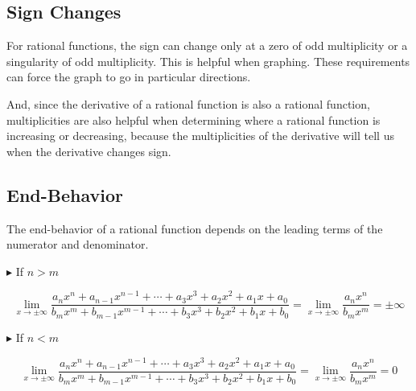 \documentclass{ximera}
\begin{document}
\subsection*{Sign Changes}

For rational functions, the sign can change only at a zero of odd multiplicity or a singularity of odd multiplicity. This is helpful when graphing. These requirements can force the graph to go in particular directions.

And, since the derivative of a rational function is also a rational function, multiplicities are also helpful when determining where a rational function is increasing or decreasing, because the multiplicities of the derivative will tell us when the derivative changes sign. 









\subsection*{End-Behavior}



The end-behavior of a rational function depends on the leading terms of the numerator and denominator.





\textbf{\textcolor{red!70!darkgray}{$\blacktriangleright$}} If $n > m$




\[   \lim\limits_{x \to \pm\infty}  \frac{ a_n x^n + a_{n-1} x^{n-1} + \cdots + a_3 x^3 + a_2 x^2 + a_1 x + a_0  } { b_m x^m + b_{m-1} x^{m-1} + \cdots + b_3 x^3 + b_2 x^2 + b_1 x + b_0 }   = \lim\limits_{x \to \pm\infty} \frac{ a_n x^n } { b_m x^m } = \pm \infty
\]











\textbf{\textcolor{red!70!darkgray}{$\blacktriangleright$}} If $n < m$




\[  \lim\limits_{x \to \pm\infty} \frac{ a_n x^n + a_{n-1} x^{n-1} + \cdots + a_3 x^3 + a_2 x^2 + a_1 x + a_0  } { b_m x^m + b_{m-1} x^{m-1} + \cdots + b_3 x^3 + b_2 x^2 + b_1 x + b_0 }   = \lim\limits_{x \to \pm\infty} \frac{ a_n x^n } { b_m x^m } = 0
\]
\end{document}
